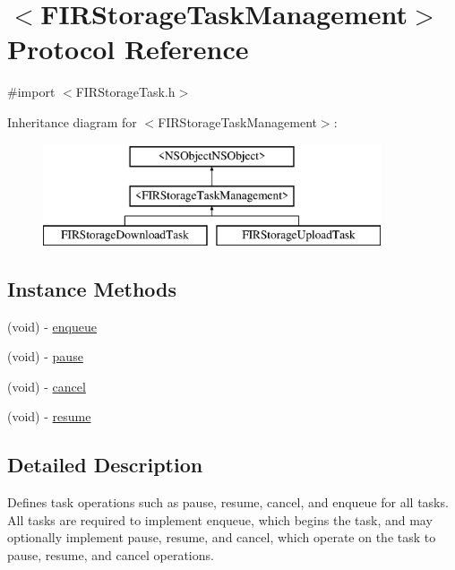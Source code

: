 \hypertarget{protocol_f_i_r_storage_task_management-p}{}\section{$<$F\+I\+R\+Storage\+Task\+Management$>$ Protocol Reference}
\label{protocol_f_i_r_storage_task_management-p}


{\ttfamily \#import $<$F\+I\+R\+Storage\+Task.\+h$>$}

Inheritance diagram for $<$F\+I\+R\+Storage\+Task\+Management$>$\+:\begin{figure}[H]
\begin{center}
\leavevmode
\includegraphics[height=3.000000cm]{protocol_f_i_r_storage_task_management-p}
\end{center}
\end{figure}
\subsection*{Instance Methods}
\begin{DoxyCompactItemize}
\item 
(void) -\/ \hyperlink{protocol_f_i_r_storage_task_management-p_a5880231d7772396d921a0a63947fd8ab}{enqueue}
\item 
(void) -\/ \hyperlink{protocol_f_i_r_storage_task_management-p_a10d343bfc205a310c715e603400711eb}{pause}
\item 
(void) -\/ \hyperlink{protocol_f_i_r_storage_task_management-p_a5cd4dce96e7d51ad060969b7b0732cda}{cancel}
\item 
(void) -\/ \hyperlink{protocol_f_i_r_storage_task_management-p_a0f47370079e4410065bde1578eb6247b}{resume}
\end{DoxyCompactItemize}


\subsection{Detailed Description}
Defines task operations such as pause, resume, cancel, and enqueue for all tasks. All tasks are required to implement enqueue, which begins the task, and may optionally implement pause, resume, and cancel, which operate on the task to pause, resume, and cancel operations. 


